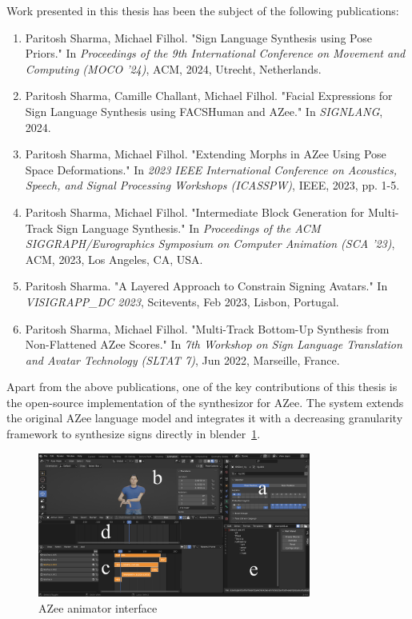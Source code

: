 \documentclass[../../main.tex]{subfiles}
\begin{document}
Work presented in this thesis has been the subject of the following publications:

\begin{enumerate}
    \item Paritosh Sharma, Michael Filhol. "Sign Language Synthesis using Pose Priors." In \textit{Proceedings of the 9th International Conference on Movement and Computing (MOCO '24)}, ACM, 2024, Utrecht, Netherlands.
    
    \item Paritosh Sharma, Camille Challant, Michael Filhol. "Facial Expressions for Sign Language Synthesis using FACSHuman and AZee." In \textit{SIGNLANG}, 2024.
    
    \item Paritosh Sharma, Michael Filhol. "Extending Morphs in AZee Using Pose Space Deformations." In \textit{2023 IEEE International Conference on Acoustics, Speech, and Signal Processing Workshops (ICASSPW)}, IEEE, 2023, pp. 1-5.
    
    \item Paritosh Sharma, Michael Filhol. "Intermediate Block Generation for Multi-Track Sign Language Synthesis." In \textit{Proceedings of the ACM SIGGRAPH/Eurographics Symposium on Computer Animation (SCA '23)}, ACM, 2023, Los Angeles, CA, USA.
    
    \item Paritosh Sharma. "A Layered Approach to Constrain Signing Avatars." In \textit{VISIGRAPP\_DC 2023}, Scitevents, Feb 2023, Lisbon, Portugal.
    
    \item Paritosh Sharma, Michael Filhol. "Multi-Track Bottom-Up Synthesis from Non-Flattened AZee Scores." In \textit{7th Workshop on Sign Language Translation and Avatar Technology (SLTAT 7)}, Jun 2022, Marseille, France.
\end{enumerate}

Apart from the above publications, one of the key contributions of this thesis is the open-source implementation of the synthesizor for AZee. The system extends the original AZee language model and integrates it with a decreasing granularity framework to synthesize signs directly in blender~\ref{fig:conclusion:azee_animator_interface}.

\begin{figure}[ht]
    \centering
    \includegraphics[width=0.8\textwidth]{chapters/conclusion/images/blender-interface.png}
    \caption{AZee animator interface}
    \label{fig:conclusion:azee_animator_interface}
\end{figure}
\end{document}
